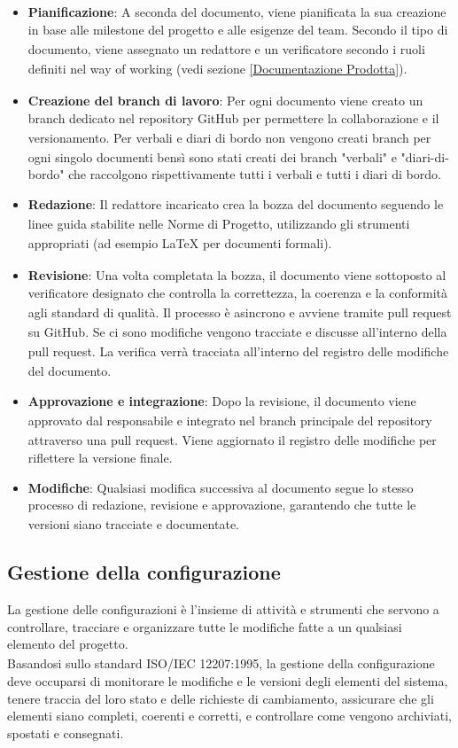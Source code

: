 \documentclass[a4paper,11pt]{article}
\newcommand{\G}{\textsubscript{\scalebox{0.6}{\textbf{G}}}}
\begin{document}
\begin{itemize}
    \item \textbf{Pianificazione}: A seconda del documento, viene pianificata la sua creazione in base alle milestone\G{} 
    del progetto\G{} e alle esigenze del team. Secondo il tipo di documento, viene assegnato un redattore\G{} e un verificatore\G{} 
    secondo i ruoli definiti nel way of working\G{} (vedi sezione \ref{Documentazione Prodotta}).
    \item \textbf{Creazione del branch di lavoro}: Per ogni documento viene creato un branch dedicato nel repository\G{} GitHub\G{} per permettere
     la collaborazione e il versionamento\G{}. Per verbali e diari di bordo non vengono creati branch per ogni singolo documenti bensì 
     sono stati creati dei branch "verbali" e "diari-di-bordo" che raccolgono rispettivamente tutti i verbali e tutti i diari di bordo.
    \item \textbf{Redazione}: Il redattore\G{} incaricato crea la bozza del documento seguendo le linee guida stabilite
     nelle Norme di Progetto\G{}, utilizzando gli strumenti appropriati (ad esempio LaTeX\G{} per documenti formali).
    \item \textbf{Revisione}: Una volta completata la bozza, il documento viene sottoposto al verificatore\G{} designato che controlla
     la correttezza, la coerenza e la conformità agli standard di qualità\G{}. Il processo è asincrono e 
     avviene tramite pull request su GitHub\G{}. Se ci sono modifiche vengono tracciate e discusse all'interno della pull request. 
     La verifica\G{} verrà tracciata all'interno del registro delle modifiche del documento.
    \item \textbf{Approvazione\G{} e integrazione}: Dopo la revisione, il documento viene approvato dal responsabile\G{} e integrato 
    nel branch principale del repository\G{} attraverso una pull request.
    Viene aggiornato il registro delle modifiche per riflettere la versione finale.
    \item \textbf{Modifiche}: Qualsiasi modifica successiva al documento segue lo stesso processo di redazione, revisione e approvazione\G{},
     garantendo che tutte le versioni siano tracciate e documentate.
\end{itemize}

\subsection{Gestione della configurazione}\label{gestione configurazione}
La gestione delle configurazioni è l'insieme di attività e strumenti che servono a controllare, 
tracciare e organizzare tutte le modifiche fatte a un qualsiasi elemento del progetto\G{}.\\
Basandosi sullo standard ISO/IEC 12207:1995, la gestione della configurazione deve occuparsi di monitorare
 le modifiche e le versioni degli elementi del sistema, tenere traccia del loro stato e delle
 richieste di cambiamento, assicurare che gli elementi siano completi, coerenti e corretti,
  e controllare come vengono archiviati, spostati e consegnati. 
\end{document}
